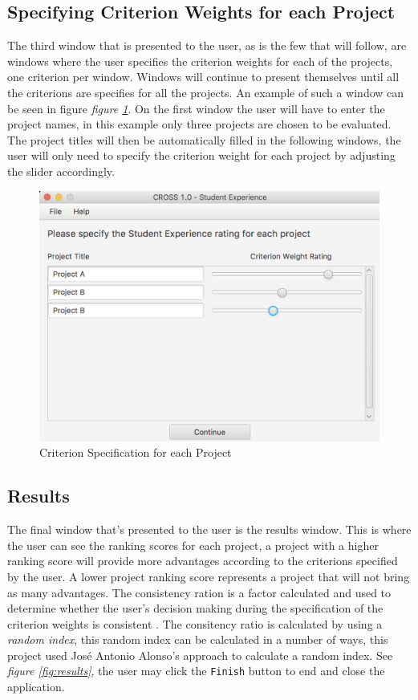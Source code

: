\documentclass[11pt]{article}
\newcommand{\code}[1]{\texttt{#1}}
\begin{document}
		\subsection{Specifying Criterion Weights for each Project}
			The third window that is presented to the user, as is the few that will follow, are windows where the user specifies the criterion weights for each of the projects, one criterion per window. Windows will continue to present themselves until all the criterions are specifies for all the projects. An example of such a window can be seen in figure \textit{figure \ref{fig:criterion_iterator}}. On the first window the user will have to enter the project names, in this example only three projects are chosen to be evaluated. The project titles will then be automatically filled in the following windows, the user will only need to specify the criterion weight for each project by adjusting the slider accordingly.

			\begin{figure}[!htb]
				\centering
				\includegraphics[scale=0.55]{criterion_iterator}
				\caption{Criterion Specification for each Project} %
				\label{fig:criterion_iterator} %
			\end{figure}


		\subsection{Results}
			The final window that's presented to the user is the results window. This is where the user can see the ranking scores for each project, a project with a higher ranking score will provide more advantages according to the criterions specified by the user. A lower project ranking score represents a project that will not bring as many advantages. The consistency ration is a factor calculated and used to determine whether the user's decision making during the specification of the criterion weights is consistent \cite{taylor2004introduction}. The consitency ratio is calculated by using a \textit{random index}, this random index can be calculated in a number of ways, this project used Jos\'e Antonio Alonso's approach \cite{alonso2006consistency} to calculate a random index. See \textit{figure \ref{fig:results}}, the user may click the \code{Finish} button to end and close the application.
\end{document}

